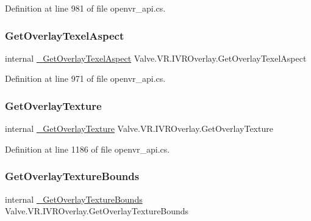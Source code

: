 Definition at line 981 of file openvr\+\_\+api.\+cs.

\mbox{\label{struct_valve_1_1_v_r_1_1_i_v_r_overlay_af0307f752cded8ffd89a0d9fda03a24e}} 
\subsubsection{\texorpdfstring{GetOverlayTexelAspect}{GetOverlayTexelAspect}}
{\footnotesize\ttfamily internal \mbox{\hyperlink{struct_valve_1_1_v_r_1_1_i_v_r_overlay_a235f2a043c603054667fe6c3df416dce}{\+\_\+\+Get\+Overlay\+Texel\+Aspect}} Valve.\+V\+R.\+I\+V\+R\+Overlay.\+Get\+Overlay\+Texel\+Aspect}



Definition at line 971 of file openvr\+\_\+api.\+cs.

\mbox{\label{struct_valve_1_1_v_r_1_1_i_v_r_overlay_a5f92b4b43e2fe9bf42f8cf4a1c4a2481}} 
\subsubsection{\texorpdfstring{GetOverlayTexture}{GetOverlayTexture}}
{\footnotesize\ttfamily internal \mbox{\hyperlink{struct_valve_1_1_v_r_1_1_i_v_r_overlay_a4736d358cfb1631b67f42d25c9850da3}{\+\_\+\+Get\+Overlay\+Texture}} Valve.\+V\+R.\+I\+V\+R\+Overlay.\+Get\+Overlay\+Texture}



Definition at line 1186 of file openvr\+\_\+api.\+cs.

\mbox{\label{struct_valve_1_1_v_r_1_1_i_v_r_overlay_a59ccd461a9056561895307685cacc479}} 
\subsubsection{\texorpdfstring{GetOverlayTextureBounds}{GetOverlayTextureBounds}}
{\footnotesize\ttfamily internal \mbox{\hyperlink{struct_valve_1_1_v_r_1_1_i_v_r_overlay_afae80e32021ddd3855f12f12aa5a0022}{\+\_\+\+Get\+Overlay\+Texture\+Bounds}} Valve.\+V\+R.\+I\+V\+R\+Overlay.\+Get\+Overlay\+Texture\+Bounds}



